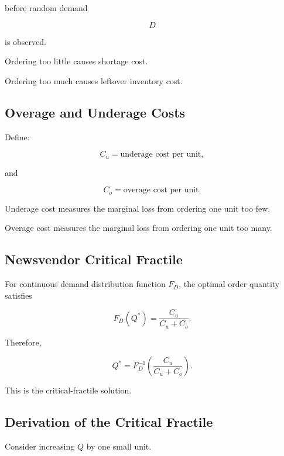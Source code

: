 before random demand

\[
\boxed{
D
}
\]

is observed.

Ordering too little causes shortage cost.

Ordering too much causes leftover inventory cost.

\subsection{Overage and Underage Costs}
\label{subsec:overage-underage-costs}

Define:

\[
\boxed{
C_u
=
\text{underage cost per unit},
}
\]

and

\[
\boxed{
C_o
=
\text{overage cost per unit}.
}
\]

Underage cost measures the marginal loss from ordering one unit too few.

Overage cost measures the marginal loss from ordering one unit too many.

\subsection{Newsvendor Critical Fractile}
\label{subsec:newsvendor-critical-fractile}

For continuous demand distribution function \(F_D\), the optimal order
quantity satisfies

\[
\boxed{
F_D(Q^*)
=
\frac{
C_u
}{
C_u+C_o
}.
}
\]

Therefore,

\[
\boxed{
Q^*
=
F_D^{-1}
\left(
\frac{
C_u
}{
C_u+C_o
}
\right).
}
\]

This is the critical-fractile solution.

\subsection{Derivation of the Critical Fractile}
\label{subsec:newsvendor-critical-fractile-derivation}

Consider increasing \(Q\) by one small unit.

